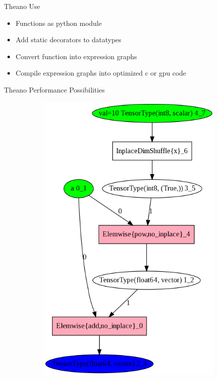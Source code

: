 \documentclass{beamer}
\begin{document}
\begin{frame}{Theano Use}

 \begin{itemize}
  \item Functions as python module
  \item Add static decorators to datatypes
  \item Convert function into expression graphs
  \item Compile expression graphs into optimized c or gpu code
 \end{itemize}
\end{frame}
\begin{frame}{Theano Performance Possibilities}
 \begin{figure}
 \begin{subfigure}
    \centering \includegraphics[scale=.20]{doc/fgraph}
 \end{subfigure}

\end{figure}
\end{frame}
\end{document}
